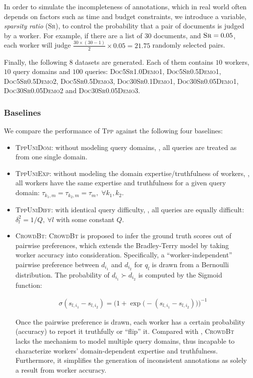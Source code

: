 In order to simulate the incompleteness of annotations, which in real world
often depends on factors such as time and budget constraints, we introduce a
variable, \emph{sparsity ratio} (\textsc{Sr}), to control the probability that a
pair of documents is judged by a worker.  For example, if there are a list of
$30$ documents, and $\textsc{Sr} = 0.05$, each worker will judge $\frac{30\times
(30-1)}{2} \times 0.05 = 21.75$ randomly selected pairs.

Finally, the following $8$ datasets are generated. Each of them contains $10$
workers, $10$ query domains and $100$ queries:  \textsc{Doc5Sr1.0Demo1,
Doc5Sr0.5Demo1, Doc5Sr0.5Demo2, Doc5Sr0.5Demo3}, \textsc{Doc30Sr0.1Demo1},
\textsc{Doc30Sr0.05Demo1}, \textsc{Doc30Sr0.05Demo2} and
\textsc{Doc30Sr0.05Demo3}.

\subsubsection{Baselines}
We compare the performance of \textsc{Tpp} against the following four baselines:
\begin{itemize}
\item \textsc{TppUniDom}: \tpp{} without modeling query domains, \ie, all
  queries are treated as from one single domain.
\item \textsc{TppUniExp}: \tpp{} without modeling the domain
  expertise/truthfulness of workers, \ie, all workers have the same expertise
  and truthfulness for a given query domain: $\tau_{k_1,m} = \tau_{k_2, m} =
  \tau_m,$ $\forall k_1, k_2$.
\item \textsc{TppUniDiff}: \tpp{} with identical query difficulty, \ie, all
  queries are equally difficult: $\delta_l^2 = 1/Q,~ \forall l$ with some
  constant $Q$.
\item \textsc{CrowdBt}: \textsc{CrowdBt} \cite{chen2013pairwise} is proposed to
  infer the ground truth scores out of pairwise preferences, which extends the
  Bradley-Terry model by taking worker accuracy into consideration.
  Specifically, a ``worker-independent'' pairwise preference between $d_{i_1}$
  and $d_{i_2}$ for $q_l$ is drawn from a Bernoulli distribution. The
  probability of $d_{i_1} \succ d_{i_2}$ is computed by the Sigmoid function:

  \begin{align}
  \sigma( s_{l, i_1} - s_{l, i_2}) =
    \Big( 1 + \exp\big( -\left(s_{l, i_1} - s_{l, i_2}\right) \big) \Big)^{-1}
    \nonumber
  \end{align}

  Once the pairwise preference is drawn, each worker has a certain probability
  (accuracy) to report it truthfully or ``flip'' it. Compared with \tpp{},
  \textsc{CrowdBt} lacks the mechanism to model multiple query domains, thus
  incapable to characterize workers' domain-dependent expertise and
  truthfulness. Furthermore, it simplifies the generation of inconsistent
  annotations as solely a result from worker accuracy.
\end{itemize}

